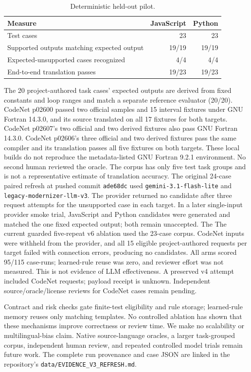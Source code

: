 \documentclass[10pt,conference]{IEEEtran}
\begin{document}
\begin{table}[t]
\centering
\caption{Deterministic held-out pilot.}
\label{tab:results}
\begin{tabular}{lrr}
\toprule
Measure & JavaScript & Python \\
\midrule
Test cases & 23 & 23 \\
Supported outputs matching expected output & 19/19 & 19/19 \\
Expected-unsupported cases recognized & 4/4 & 4/4 \\
End-to-end translation passes & 19/23 & 19/23 \\
\bottomrule
\end{tabular}
\end{table}

The 20 project-authored task cases' expected outputs are derived from fixed constants
and loop ranges and match a separate reference evaluator (20/20). CodeNet p02600 passed
two official samples and 15 interval fixtures under GNU Fortran 14.3.0, and its source
translated on all 17 fixtures for both targets. CodeNet p02607's two official and two
derived fixtures also pass GNU Fortran 14.3.0. CodeNet p02606's three official and two
derived fixtures pass the same compiler and its translation passes all five fixtures
on both targets. These local builds do not reproduce the
metadata-listed GNU Fortran 9.2.1 environment. No second human reviewed the oracle. The
corpus has only five test task groups and is not a representative estimate of
translation accuracy. The original
24-case paired refresh at pushed commit \texttt{ade68dc} used
\texttt{gemini-3.1-flash-lite} and \texttt{legacy-modernizer-llm-v3}. The provider
returned no candidate after three request attempts for the unsupported case in each
target. In a later single-input provider smoke trial, JavaScript and Python candidates
were generated and matched the one fixed expected output; both remain unaccepted. The
The current guarded five-repeat v6 ablation used the 23-case corpus. CodeNet inputs were
withheld from the provider, and all 15 eligible project-authored requests per target
failed with connection errors, producing no candidates. All arms scored 95/115 case-runs;
learned-rule reuse was zero, and reviewer effort was not measured. This is not evidence
of LLM effectiveness. A preserved v4 attempt included CodeNet requests; payload receipt
is unknown. Independent source/oracle/license reviews for CodeNet cases remain pending.

Contract and risk checks gate finite-test eligibility and rule storage; learned-rule
memory reuses only matching templates. No controlled ablation has shown that these
mechanisms improve correctness or review time. We make no scalability or multilingual-bias claim. Native source-language oracles,
a larger task-grouped corpus, independent human review, and repeated controlled model
trials remain future work. The complete run provenance and case JSON
are linked in the repository's \texttt{data/EVIDENCE\_V3\_REFRESH.md}.
\end{document}

